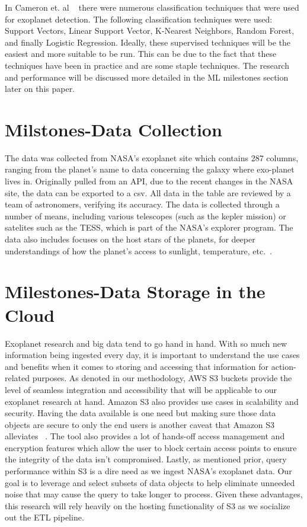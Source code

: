 \documentclass[letterpaper, 10 pt, conference]{ieeeconf}  %
\begin{document}
In Cameron et. al ~\cite{MLApproachesExoPlanets} there were numerous classification techniques that were used for exoplanet detection. The following classification techniques were used: Support Vectors, Linear Support Vector, K-Nearest Neighbors, Random Forest, and finally Logistic Regression. Ideally, these supervised techniques will be the easiest and more suitable to be run. This can be due to the fact that these techniques have been in practice and are some staple techniques. The research and performance will be discussed more detailed in the ML milestones section later on this paper.

\section{Milstones-Data Collection}

The data was collected from NASA's exoplanet site which contains 287 columns, ranging from the planet's name to data concerning the galaxy where exo-planet lives in. Originally pulled from an API, due to the recent changes in the NASA site, the data can be exported to a csv. All data in the table are reviewed by a team of astronomers, verifying its accuracy. The data is collected through a number of means, including various telescopes (such as the kepler mission) or satelites such as the TESS, which is part of the NASA's explorer program. The data also includes focuses on the host stars of the planets, for deeper understandings of how the planet's access to sunlight, temperature, etc.~\cite{nasaExoplanetArchive}. 

\section{Milestones-Data Storage in the Cloud}

Exoplanet research and big data tend to go hand in hand. With so much new information being ingested every day, it is important to understand the use cases and benefits when it comes to storing and accessing that information for action-related purposes. As denoted in our methodology, AWS S3 buckets provide the level of seamless integration and accessibility that will be applicable to our exoplanet research at hand. Amazon S3 also provides use cases in scalability and security. Having the data available is one need but making sure those data objects are secure to only the end users is another caveat that Amazon S3 alleviates ~\cite{AmazonS3}. The tool also provides a lot of hands-off access management and encryption features which allow the user to block certain access points to ensure the integrity of the data isn't compromised. Lastly, as mentioned prior, query performance within S3 is a dire need as we ingest NASA's exoplanet data. Our goal is to leverage and select subsets of data objects to help eliminate unneeded noise that may cause the query to take longer to process. Given these advantages, this research will rely heavily on the hosting functionality of S3 as we socialize out the ETL pipeline.
\end{document}

